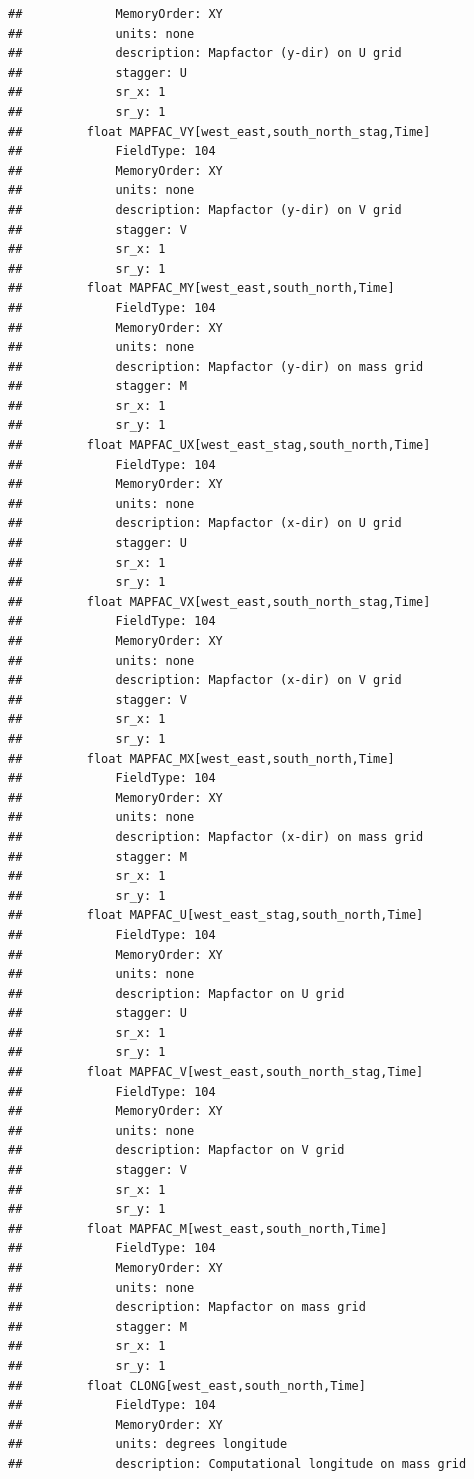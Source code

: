 \documentclass[]{book}
\theoremstyle{definition}
\theoremstyle{definition}
\theoremstyle{definition}
\theoremstyle{remark}
\begin{document}
\begin{verbatim}
##             MemoryOrder: XY 
##             units: none
##             description: Mapfactor (y-dir) on U grid
##             stagger: U
##             sr_x: 1
##             sr_y: 1
##         float MAPFAC_VY[west_east,south_north_stag,Time]   
##             FieldType: 104
##             MemoryOrder: XY 
##             units: none
##             description: Mapfactor (y-dir) on V grid
##             stagger: V
##             sr_x: 1
##             sr_y: 1
##         float MAPFAC_MY[west_east,south_north,Time]   
##             FieldType: 104
##             MemoryOrder: XY 
##             units: none
##             description: Mapfactor (y-dir) on mass grid
##             stagger: M
##             sr_x: 1
##             sr_y: 1
##         float MAPFAC_UX[west_east_stag,south_north,Time]   
##             FieldType: 104
##             MemoryOrder: XY 
##             units: none
##             description: Mapfactor (x-dir) on U grid
##             stagger: U
##             sr_x: 1
##             sr_y: 1
##         float MAPFAC_VX[west_east,south_north_stag,Time]   
##             FieldType: 104
##             MemoryOrder: XY 
##             units: none
##             description: Mapfactor (x-dir) on V grid
##             stagger: V
##             sr_x: 1
##             sr_y: 1
##         float MAPFAC_MX[west_east,south_north,Time]   
##             FieldType: 104
##             MemoryOrder: XY 
##             units: none
##             description: Mapfactor (x-dir) on mass grid
##             stagger: M
##             sr_x: 1
##             sr_y: 1
##         float MAPFAC_U[west_east_stag,south_north,Time]   
##             FieldType: 104
##             MemoryOrder: XY 
##             units: none
##             description: Mapfactor on U grid
##             stagger: U
##             sr_x: 1
##             sr_y: 1
##         float MAPFAC_V[west_east,south_north_stag,Time]   
##             FieldType: 104
##             MemoryOrder: XY 
##             units: none
##             description: Mapfactor on V grid
##             stagger: V
##             sr_x: 1
##             sr_y: 1
##         float MAPFAC_M[west_east,south_north,Time]   
##             FieldType: 104
##             MemoryOrder: XY 
##             units: none
##             description: Mapfactor on mass grid
##             stagger: M
##             sr_x: 1
##             sr_y: 1
##         float CLONG[west_east,south_north,Time]   
##             FieldType: 104
##             MemoryOrder: XY 
##             units: degrees longitude
##             description: Computational longitude on mass grid

\end{verbatim}
\end{document}
